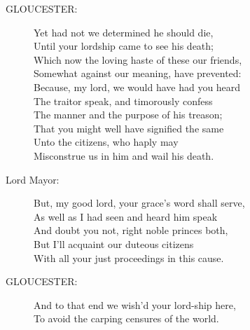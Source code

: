\documentclass{article}
\begin{document}
\begin{description}
\item[GLOUCESTER:] 
\hspace{1pt}Yet had not we determined he should die,\\
\hspace{1pt}Until your lordship came to see his death;\\
\hspace{1pt}Which now the loving haste of these our friends,\\
\hspace{1pt}Somewhat against our meaning, have prevented:\\
\hspace{1pt}Because, my lord, we would have had you heard\\
\hspace{1pt}The traitor speak, and timorously confess\\
\hspace{1pt}The manner and the purpose of his treason;\\
\hspace{1pt}That you might well have signified the same\\
\hspace{1pt}Unto the citizens, who haply may\\
\hspace{1pt}Misconstrue us in him and wail his death.\\
\end{description}
\begin{description}
\item[Lord Mayor:] 
\hspace{1pt}But, my good lord, your grace's word shall serve,\\
\hspace{1pt}As well as I had seen and heard him speak\\
\hspace{1pt}And doubt you not, right noble princes both,\\
\hspace{1pt}But I'll acquaint our duteous citizens\\
\hspace{1pt}With all your just proceedings in this cause.\\
\end{description}
\begin{description}
\item[GLOUCESTER:] 
\hspace{1pt}And to that end we wish'd your lord-ship here,\\
\hspace{1pt}To avoid the carping censures of the world.\\
\end{description}
\end{document}
